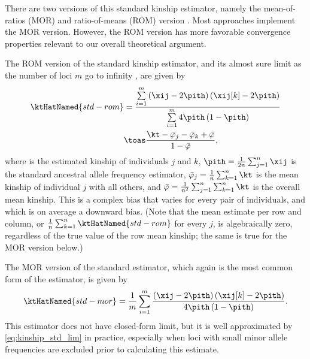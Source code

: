 \documentclass[11pt]{article}
\begin{document}
There are two versions of this standard kinship estimator, namely the mean-of-ratios (MOR) and ratio-of-means (ROM) version \citep{ochoa_estimating_2021}.
Most approaches implement the MOR version.
However, the ROM version has more favorable convergence properties relevant to our overall theoretical argument.

The ROM version of the standard kinship estimator, and its almost sure limit as the number of loci $m$ go to infinity \citep{ochoa_estimating_2021}, are given by
\begin{align}
  \label{eq:kinship_std_rom}
  \ktHatNamed{std-rom}
  &=
    \frac{
    \sum\limits_{i=1}^m \left( \xij - 2 \pith \right) \left( \xij[k] - 2 \pith \right)
    }{
    \sum\limits_{i=1}^m 4 \pith \left( 1-\pith \right)
    }
  \\
  \label{eq:kinship_std_lim}
  &\toas
    \frac{\kt -\bar{\varphi}_j -\bar{\varphi}_k + \bar{\varphi}}{1 - \bar{\varphi}}
    ,
\end{align}
where  is the estimated kinship of individuals $j$ and $k$,
$\pith = \frac{1}{2n} \sum_{j=1}^n \xij$ is the standard ancestral allele frequency estimator,
$\bar{\varphi}_j = \frac{1}{n} \sum_{k=1}^n \kt$ is the mean kinship of individual $j$ with all others, and
$\bar{\varphi} = \frac{1}{n^2} \sum_{j=1}^n \sum_{k=1}^n \kt$ is the overall mean kinship.
This is a complex bias that varies for every pair of individuals, and which is on average a downward bias.
(Note that the mean estimate per row and column, or $\frac{1}{n} \sum_{k=1}^n \ktHatNamed{std-rom}$ for every $j$, is algebraically zero, regardless of the true value of the row mean kinship; the same is true for the MOR version below.)

The MOR version of the standard estimator, which again is the most common form of the estimator, is given by
\begin{equation}
  \label{eq:kinship_std_mor}
  \ktHatNamed{std-mor}
  =
  \frac{1}{m} \sum\limits_{i=1}^m \frac{\left( \xij - 2 \pith \right) \left( \xij[k] - 2 \pith \right)}{4 \pith \left( 1-\pith \right)}
  .
\end{equation}
This estimator does not have closed-form limit, but it is well approximated by \cref{eq:kinship_std_lim} in practice, especially when loci with small minor allele frequencies are excluded prior to calculating this estimate.
\end{document}
